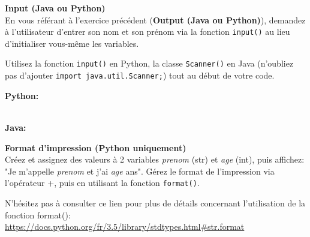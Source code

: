 \begin{Exercice}[5 minutes] \textbf{Input (Java ou Python)}\\
   En vous référant à l'exercice précédent (\textbf{Output (Java ou Python)}), demandez à l'utilisateur d'entrer son nom et son prénom via la fonction \lstinline{input()} au lieu d'initialiser vous-même les variables. \\
   
    \begin{conseil}
       Utilisez la fonction \lstinline{input()} en Python, la classe \lstinline{Scanner()} en Java (n'oubliez pas d'ajouter \lstinline{import java.util.Scanner;}) tout au début de votre code. 
        
    \end{conseil}
    \begin{solution}
    
    \textbf{Python:} 
    
    
    \textbf{\\Java:}
      
       
        
    \end{solution}   
\end{Exercice}

\begin{Exercice}[5 minutes] \textbf{Format d'impression (Python uniquement)}\\
   Créez et assignez des valeurs à 2 variables \textit{prenom} (str) et \textit{age} (int), puis affichez: "Je m'appelle \textit{prenom} et j'ai \textit{age} ans". Gérez le format de l'impression via l'opérateur +, puis en utilisant la fonction \lstinline{format()}. \\
   
    \begin{conseil}
       N'hésitez pas à consulter ce lien pour plus de détails concernant l'utilisation de la fonction format(): \url{
        https://docs.python.org/fr/3.5/library/stdtypes.html\#str.format}
    \end{conseil}
    \begin{solution}
     
    
           
    \end{solution}   
\end{Exercice}

